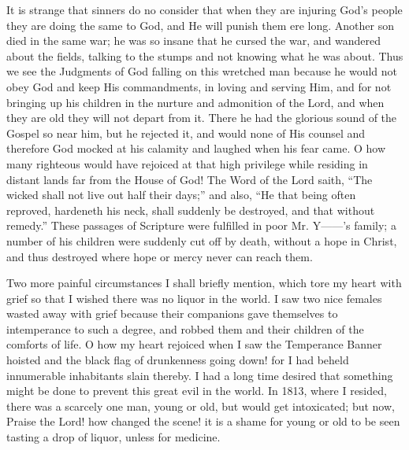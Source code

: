 \documentclass{article}
\begin{document}
It is strange that sinners do no consider that when they are injuring God's people they are doing the same to God, and He will punish them ere long.
Another son died in the same war; he was so insane that he cursed the war, and wandered about the fields, talking to the stumps and not knowing what he was about.
Thus we see the Judgments of God falling on this wretched man because he would not obey God and keep His commandments, in loving and serving Him, and for not bringing up his children in the nurture and admonition of the Lord, and when they are old they will not depart from it.
There he had the glorious sound of the Gospel so near him, but he rejected it, and would none of His counsel and therefore God mocked at his calamity and laughed when his fear came.
O how many righteous would have rejoiced at that high privilege while residing in distant lands far from the House of God!
The Word of the Lord saith, ``The wicked shall not live out half their days;'' and also, ``He that being often reproved, hardeneth his neck, shall suddenly be destroyed, and that without remedy.''
These passages of Scripture were fulfilled in poor Mr. Y------'s family; a number of his children were suddenly cut off by death, without a hope in Christ, and thus destroyed where hope or mercy never can reach them.

Two more painful circumstances I shall briefly mention, which tore my heart with grief so that I wished there was no liquor in the world.
I saw two nice females wasted away with grief because their companions gave themselves to intemperance to such a degree, and robbed them and their children of the comforts of life.
O how my heart rejoiced when I saw the Temperance Banner hoisted and the black flag of drunkenness going down! for I had beheld innumerable inhabitants slain thereby.
I had a long time desired that something might be done to prevent this great evil in the world.
In 1813, where I resided, there was a scarcely one man, young or old, but would get intoxicated; but now, Praise the Lord! how changed the scene! it is a shame for young or old to be seen tasting a drop of liquor, unless for medicine.
\end{document}
